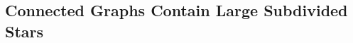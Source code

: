 \documentclass[lotsofwhite]{patmorin}
\newcommand{\defn}[1]{\textcolor{Maroon}{\emph{#1}}}
\DeclarePairedDelimiter{\floor}{\lfloor}{\rfloor}
\renewcommand{\ge}{\geqslant}
\renewcommand{\geq}{\geqslant}
\newcommand{\PP}{\mathcal{P}}
\theoremstyle{plain}
\newtheorem{lem}[thm]{Lemma}
\theoremstyle{definition}
\begin{document}
\subsection{Connected Graphs Contain Large Subdivided Stars}








\end{document}
